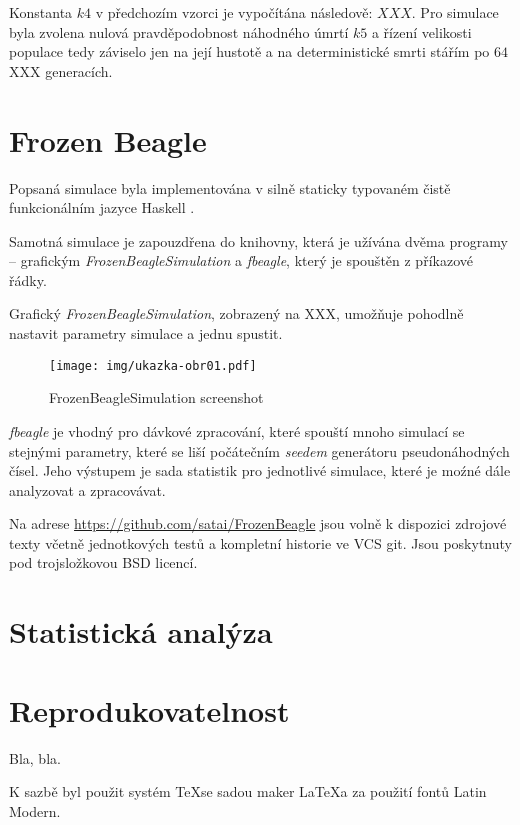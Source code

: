 Konstanta $k4$ v předchozím vzorci je vypočítána následově: $XXX$. Pro simulace byla zvolena nulová pravděpodobnost
náhodného úmrtí $k5$ a řízení velikosti populace tedy záviselo jen na její hustotě a na deterministické smrti
stářím po $64$ XXX generacích.


\section{Frozen Beagle}

Popsaná simulace byla implementována v silně staticky typovaném čistě funkcionálním jazyce Haskell \citep{Haskell}.

Samotná simulace je zapouzdřena do knihovny, která je užívána dvěma programy -- grafickým
\textit{FrozenBeagleSimulation} a \textit{fbeagle}, který je spouštěn z příkazové řádky.

Grafický \textit{FrozenBeagleSimulation}, zobrazený na XXX,
umožňuje pohodlně nastavit parametry simulace a jednu spustit.



\begin{figure}
\centering
\texttt{[image: img/ukazka-obr01.pdf]}
    \caption{FrozenBeagleSimulation screenshot}
\end{figure}


\textit{fbeagle} je vhodný pro dávkové zpracování, které spouští mnoho simulací se stejnými parametry, které se liší počátečním \textit{seedem} generátoru pseudonáhodných čísel. Jeho výstupem je sada statistik pro jednotlivé simulace, které je moźné dále analyzovat a zpracovávat.

Na adrese \url {https://github.com/satai/FrozenBeagle} jsou volně k dispozici zdrojové texty včetně jednotkových testů a kompletní historie ve VCS git. Jsou poskytnuty pod trojsložkovou BSD licencí.

\section{Statistická analýza}

\section{Reprodukovatelnost}

Bla, bla.

K sazbě byl použit systém \TeX se sadou maker \LaTeX a za použití fontů Latin Modern.
